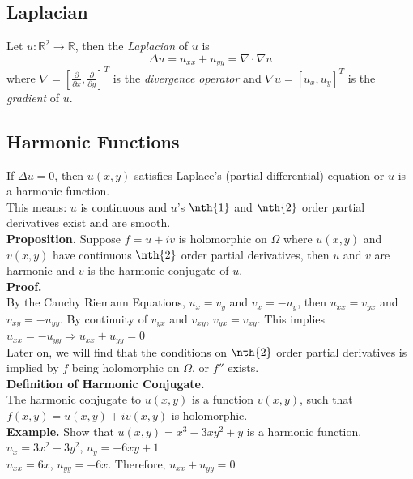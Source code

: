 \documentclass[11pt]{article}
\begin{document}
\subsection{Laplacian}
Let $u: \mathbb{R}^2 \to \mathbb{R}$, then the \textit{Laplacian} of $u$ is 
$$\Delta u = u_{xx} + u_{yy} = \nabla \cdot \nabla u$$
 where 
$\nabla = [\frac{\partial}{\partial x}, \frac{\partial}{\partial y}]^T$ is the \textit{divergence operator} and $\nabla u = [u_x, u_y]^T$ is the \textit{gradient} of $u$. 
\subsection{Harmonic Functions}
If $\Delta u = 0$, then $u(x, y)$ satisfies Laplace's (partial differential) equation or $u$ is a harmonic function. \\
This means: $u$ is continuous and $u$'s $\nth{1}$ and $\nth{2}$ order partial derivatives exist and are smooth. \\
\newline
\textbf{Proposition.} Suppose $f = u + iv$ is holomorphic on $\Omega$ where $u(x, y)$ and $v(x, y)$ have continuous $\nth{2}$ order partial derivatives, then $u$ and $v$ are harmonic and $v$ is the harmonic conjugate of $u$. \\
\textbf{Proof.} \\
By the Cauchy Riemann Equations, $u_x = v_y$ and $v_x = -u_y$, then $u_{xx} = v_{yx}$ and $v_{xy} = -u_{yy}$. By continuity of $v_{yx}$ and $v_{xy}$, $v_{yx} = v_{xy}$. This implies $u_{xx} = -u_{yy} \Rightarrow u_{xx} + u_{yy} = 0$ \\
Later on, we will find that the conditions on $\nth{2}$ order partial derivatives is implied by $f$ being holomorphic on $\Omega$, or $f''$ exists. \\
\newline
\textbf{Definition of Harmonic Conjugate.} \\
The harmonic conjugate to $u(x,y)$ is a function $v(x,y)$, such that $f(x,y) = u(x,y) + iv(x,y)$ is holomorphic. \\

\textbf{Example.} Show that $u(x, y) = x^3 -3xy^2 + y$ is a harmonic function. \\
$u_x = 3x^2 - 3y^2$, $u_y = -6xy + 1$ \\
$u_{xx} = 6x$, $u_{yy} = -6x$. Therefore, $u_{xx} + u_{yy} = 0$ \\
\end{document}
